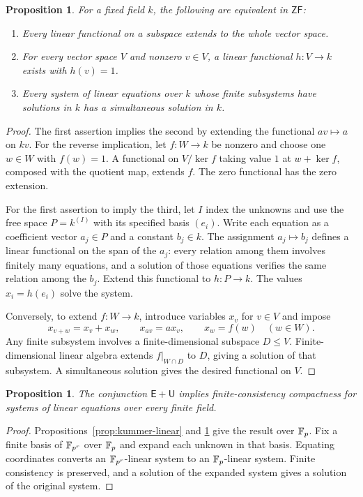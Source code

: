 \documentclass[11pt,a4paper]{article}
\newtheorem{proposition}[theorem]{Proposition}
\theoremstyle{definition}\newtheorem{definition}[theorem]{Definition}
\theoremstyle{remark}\newtheorem{remark}[theorem]{Remark}
\newcommand{\ZF}{\mathsf{ZF}}\newcommand{\ZFA}{\mathsf{ZFA}}
\newcommand{\E}{\mathsf E}\newcommand{\U}{\mathsf U}
\begin{document}
\begin{proposition}\label{prop:linear-compactness-equivalence}
For a fixed field $k$, the following are equivalent in $\ZF$:
\begin{enumerate}
\item Every linear functional on a subspace extends to the whole vector space.
\item For every vector space $V$ and nonzero $v\in V$, a linear functional
      $h:V\to k$ exists with $h(v)=1$.
\item Every system of linear equations over $k$ whose finite subsystems
      have solutions in $k$ has a simultaneous solution in $k$.
\end{enumerate}
\end{proposition}
\begin{proof}
The first assertion implies the second by extending the functional
$av\mapsto a$ on $kv$.
For the reverse implication, let $f:W\to k$ be nonzero and choose one
$w\in W$ with $f(w)=1$.  A functional on $V/\ker f$ taking value $1$
at $w+\ker f$, composed with the quotient map, extends $f$.
The zero functional has the zero extension.

For the first assertion to imply the third, let $I$ index the unknowns
and use the free space $P=k^{(I)}$ with its specified basis $(e_i)$.
Write each equation as a coefficient vector $a_j\in P$ and a constant
$b_j\in k$.  The assignment $a_j\mapsto b_j$ defines a linear functional
on the span of the $a_j$: every relation among them involves finitely many
equations, and a solution of those equations verifies the same relation
among the $b_j$.  Extend this functional to $h:P\to k$.
The values $x_i=h(e_i)$ solve the system.

Conversely, to extend $f:W\to k$, introduce variables $x_v$ for $v\in V$
and impose
\[
 x_{v+w}=x_v+x_w,\qquad x_{av}=a x_v,\qquad x_w=f(w)\quad(w\in W).
\]
Any finite subsystem involves a finite-dimensional subspace $D\leq V$.
Finite-dimensional linear algebra extends $f|_{W\cap D}$ to $D$, giving
a solution of that subsystem.  A simultaneous solution gives the desired
functional on $V$.
\end{proof}

\begin{proposition}\label{prop:finite-field-compactness}
The conjunction $\E+\U$ implies finite-consistency compactness for systems
of linear equations over every finite field.
\end{proposition}
\begin{proof}
Propositions~\ref{prop:kummer-linear} and
\ref{prop:linear-compactness-equivalence} give the result over $\mathbb F_p$.
Fix a finite basis of $\mathbb F_{p^r}$ over $\mathbb F_p$ and expand each unknown in
that basis.  Equating coordinates converts an $\mathbb F_{p^r}$-linear system
to an $\mathbb F_p$-linear system.  Finite consistency is preserved, and a
solution of the expanded system gives a solution of the original system.
\end{proof}
\end{document}
